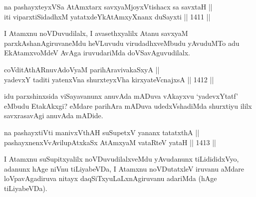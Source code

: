 \begin{shl}
\footnotemark[2]na pashayxteyxVSa AtAmx\s tarx savxyaMjoyxVtishacx sa savxtaH || \\
iti viparxtiSidadhxM yatatxdeYkAtAmxyXnanx duSayxti \hfill || 1411 || 
\end{shl}

\begin{artha}
I Atamxnu noVDuvudilalx, I avasethxyalilx Atanu savxyaM parxkAshanAgiruvaneMdu heVLuvudu virudadhxveMbudu yAvuduMTo adu EkAtamxvoMdeV AvAga iruvudariMda doVSavAguvudilalx.
\end{artha}

\begin{shl}
coVditAthARnuvAdoV\s yaM parihAravivakaSxyA || \\
yadevxY taditi yatenxVna shurxteyxVha kirxyateV\s cnajxsA \hfill || 1412 ||  
\end{shl}

\begin{artha}
idu parxshinxsida viSayavanunx anuvAda mADuva vAkayxvu `yadevxYtatf' eMbudu EtakAkxgi? eMdare parihAra mADuva udedxVshadiMda shurxtiyu ililx savxrasavAgi anuvAda mADide.
\end{artha}


\begin{shl}
na pashayxtiVti manivxVthAH suSupetxV yananx tatatxthA ||  \\
pashayxnenxVvAvilupAtxkaSx AtAmx\s yaM vataRteV yataH \hfill || 1413 ||  
\end{shl}

\begin{artha}
I Atamxnu suSupitxyalilx noVDuvudilalxveMdu yAvudanunx tiLidididxVyo, adanunx hAge niVnu tiLiyabeVDa, I Atamxnu noVDutatxleV iruvanu aMdare loVpavAgadiruva nitayx daqSiTxyuLaLxnAgiruvanu adariMda (hAge tiLiyabeVDa).
\end{artha}

